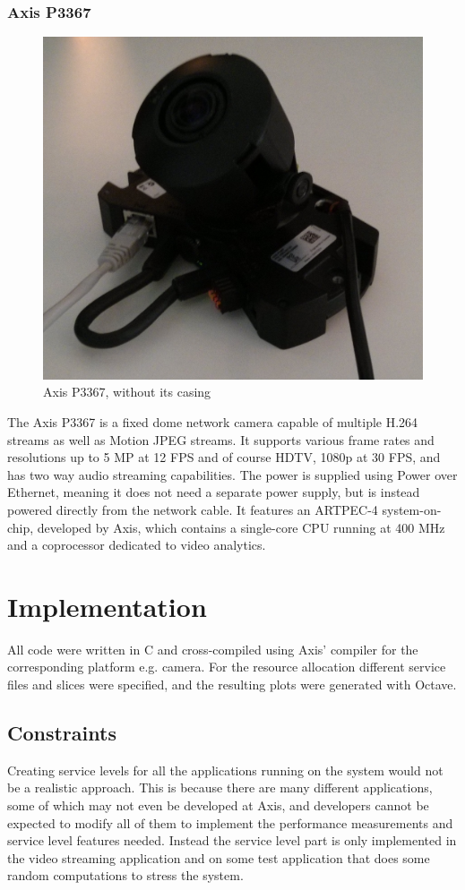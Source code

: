 \documentclass[nobiblatex]{LTHthesis}
\begin{document}
\subsection{Axis P3367}
\begin{figure}
    \centering
    \includegraphics[width=\textwidth]{p3367}
    \caption{Axis P3367, without its casing}
    \label{fig:P3367}
\end{figure}
The Axis P3367 is a fixed dome network camera capable of multiple H.264 streams as well as Motion JPEG streams. It supports various frame rates and resolutions up to 5 MP at 12 FPS and of course HDTV, 1080p at 30 FPS, and has two way audio streaming capabilities. The power is supplied using Power over Ethernet, meaning it does not need a separate power supply, but is instead powered directly from the network cable. It features an ARTPEC-4 system-on-chip, developed by Axis, which contains a single-core CPU running at 400 MHz and a coprocessor dedicated to video analytics.
\chapter{Implementation}
All code were written in C and cross-compiled using Axis' compiler for the corresponding platform e.g. camera. For the resource allocation different service files and slices were specified, and the resulting plots were generated with Octave.
\section{Constraints} %
Creating service levels for all the applications running on the system would not be a realistic approach. This is because there are many different applications, some of which may not even be developed at Axis, and developers cannot be expected to modify all of them to implement the performance measurements and service level features needed. Instead the service level part is only implemented in the video streaming application and on some test application that does some random computations to stress the system.
\end{document}
